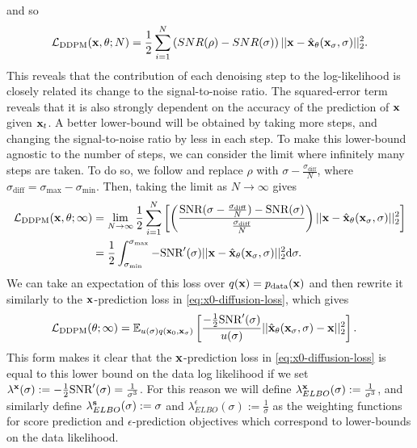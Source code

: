 and so
\begin{align}
    \mathcal{L}_\text{DDPM}({\mathbf{x}}, \theta; N) = \frac{1}{2} \sum_{i=1}^N \left( SNR(\rho) - SNR(\sigma) \right) || {\mathbf{x}} - \hat{{\mathbf{x}}}_\theta({\mathbf{x}}_\sigma, \sigma) ||_2^2.
\end{align}
This reveals that the contribution of each denoising step to the log-likelihood is closely related its change to the signal-to-noise ratio. The squared-error term reveals that it is also strongly dependent on the accuracy of the prediction of ${\mathbf{x}}$ given ${\mathbf{x}}_t$. A better lower-bound will be obtained by taking more steps, and changing the signal-to-noise ratio by less in each step. To make this lower-bound agnostic to the number of steps, we can consider the limit where infinitely many steps are taken. To do so, we  follow \citet{kingma2021variational} and replace $\rho$ with $\sigma-\frac{\sigma_\text{diff}}{N}$, where $\sigma_\text{diff} = \sigma_\text{max}-\sigma_\text{min}$. Then, taking the limit as $N \rightarrow \infty$ gives 
\begin{align}
    \mathcal{L}_\text{DDPM}({\mathbf{x}}, \theta; \infty) &= \lim_{N\rightarrow\infty} \frac{1}{2} \sum_{i=1}^N \left[ \left( \frac{\text{SNR}(\sigma-\frac{\sigma_\text{diff}}{N}) - \text{SNR}(\sigma)}{\frac{\sigma_\text{diff}}{N}} \right) || {\mathbf{x}} - \hat{{\mathbf{x}}}_\theta({\mathbf{x}}_\sigma, \sigma) ||_2^2 \right] \\
    &= \frac{1}{2} \int_{\sigma_\text{min}}^{\sigma_\text{max}} -\text{SNR}'(\sigma) || {\mathbf{x}} - \hat{{\mathbf{x}}}_\theta({\mathbf{x}}_\sigma, \sigma) ||_2^2 \mathrm{d}\sigma \label{eq:diffusion-elbo}.
\end{align}
We can take an expectation of this loss over $q({\mathbf{x}})=p_{\rm{data}}({\mathbf{x}})$ and then rewrite it similarly to the ${\mathbf{x}}$-prediction loss in \cref{eq:x0-diffusion-loss}, which gives
\begin{align} \label{eq:diffusion-loss-likelihood}
    \mathcal{L}_\text{DDPM}(\theta; \infty) &= \mathbb{E}_{u(\sigma)q({\mathbf{x}}_0, {\mathbf{x}}_\sigma)} \left[ 
    \frac{-\frac{1}{2}\text{SNR}'(\sigma)}{u(\sigma)}
    || \hat{{\mathbf{x}}}_\theta({\mathbf{x}}_\sigma, \sigma) - {\mathbf{x}} ||_2^2 \right].
\end{align}
This form makes it clear that the ${\mathbf{x}}$-prediction loss in \cref{eq:x0-diffusion-loss} is equal to this lower bound on the data log likelihood if we set $\lambda^{\mathbf{x}}(\sigma) := - \frac{1}{2} \text{SNR}'(\sigma) = \frac{1}{\sigma^3}$. For this reason we will define $\lambda^{\mathbf{x}}_{ELBO}(\sigma) := \frac{1}{\sigma^3}$, and similarly define $\lambda^{\mathbf{s}}_{ELBO}(\sigma) := \sigma$ and $\lambda^\epsilon_{ELBO}(\sigma) := \frac{1}{\sigma}$ as the weighting functions for score prediction and $\epsilon$-prediction objectives which correspond to lower-bounds on the data likelihood.

